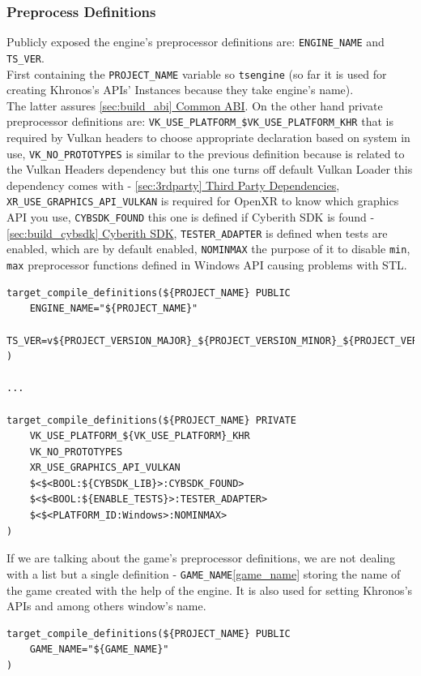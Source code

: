 \subsubsection{Preprocess Definitions}
\hspace{\parindent} Publicly exposed the engine's preprocessor definitions are: \texttt{ENGINE\_NAME} and \texttt{TS\_VER}.\\ First containing the \texttt{PROJECT\_NAME} variable so \texttt{tsengine} (so far it is used for creating Khronos's APIs' Instances because they take engine's name).\\ The latter assures \hyperref[sec:build_abi]{\ref{sec:build_abi} Common ABI}.
On the other hand private preprocessor definitions are: \texttt{VK\_USE\_PLATFORM\_\${VK\_USE\_PLATFORM}\_KHR} that is required by Vulkan headers to choose appropriate declaration based on system in use, \texttt{VK\_NO\_PROTOTYPES} is similar to the previous definition because is related to the Vulkan Headers dependency but this one turns off default Vulkan Loader this dependency comes with - \hyperref[sec:3rdparty]{\ref*{sec:3rdparty} Third Party Dependencies}, \texttt{XR\_USE\_GRAPHICS\_API\_VULKAN} is required for OpenXR to know which graphics API you use, \texttt{CYBSDK\_FOUND} this one is defined if Cyberith SDK is found - \hyperref[sec:build_cybsdk]{\ref*{sec:build_cybsdk} Cyberith SDK}, \texttt{TESTER\_ADAPTER} is defined when tests are enabled, which are by default enabled, \texttt{NOMINMAX} the purpose of it to disable \texttt{min}, \texttt{max} preprocessor functions defined in Windows API causing problems with STL.
\begin{lstlisting}[caption=Engine's preprocessor definitions (./engine/CMakeLists.txt)]
target_compile_definitions(${PROJECT_NAME} PUBLIC
    ENGINE_NAME="${PROJECT_NAME}"
    TS_VER=v${PROJECT_VERSION_MAJOR}_${PROJECT_VERSION_MINOR}_${PROJECT_VERSION_PATCH}
)

...

target_compile_definitions(${PROJECT_NAME} PRIVATE
    VK_USE_PLATFORM_${VK_USE_PLATFORM}_KHR
    VK_NO_PROTOTYPES
    XR_USE_GRAPHICS_API_VULKAN
    $<$<BOOL:${CYBSDK_LIB}>:CYBSDK_FOUND>
    $<$<BOOL:${ENABLE_TESTS}>:TESTER_ADAPTER>
    $<$<PLATFORM_ID:Windows>:NOMINMAX>
)
\end{lstlisting}

If we are talking about the game's preprocessor definitions, we are not dealing with a list but a single definition - \texttt{GAME\_NAME}\ref{game_name} storing the name of the game created with the help of the engine. It is also used for setting Khronos's APIs and among others window's name.
\begin{lstlisting}[caption=Game's preprocessor definitions (./game/CMakeLists.txt)]
target_compile_definitions(${PROJECT_NAME} PUBLIC
    GAME_NAME="${GAME_NAME}"
)
\end{lstlisting}

